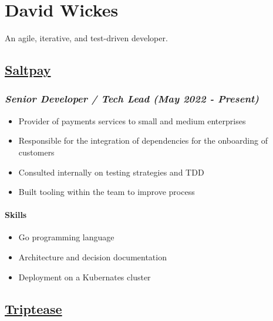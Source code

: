 \hypertarget{david-wickes}{%
\section{David Wickes}\label{david-wickes}}

An agile, iterative, and test-driven developer.

\hypertarget{saltpay}{%
\subsection{\texorpdfstring{\href{https://www.saltpay.co/}{Saltpay}}{Saltpay}}\label{saltpay}}

\hypertarget{saltpay-role}{%
\subsubsection{\texorpdfstring{\emph{Senior Developer / Tech Lead (May
2022 -
Present)}}{Senior Developer / Tech Lead (May 2022 - Present)}}\label{saltpay-role}}

\begin{itemize}
\tightlist
\item
  Provider of payments services to small and medium enterprises
\item
  Responsible for the integration of dependencies for the onboarding of
  customers
\item
  Consulted internally on testing strategies and TDD
\item
  Built tooling within the team to improve process
\end{itemize}

\hypertarget{skills-saltpay}{%
\paragraph{Skills}\label{skills-saltpay}}

\begin{itemize}
\tightlist
\item
  Go programming language
\item
  Architecture and decision documentation
\item
  Deployment on a Kubernates cluster
\end{itemize}

\hypertarget{triptease}{%
\subsection{\texorpdfstring{\href{https://www.triptease.com/}{Triptease}}{Triptease}}\label{triptease}}

